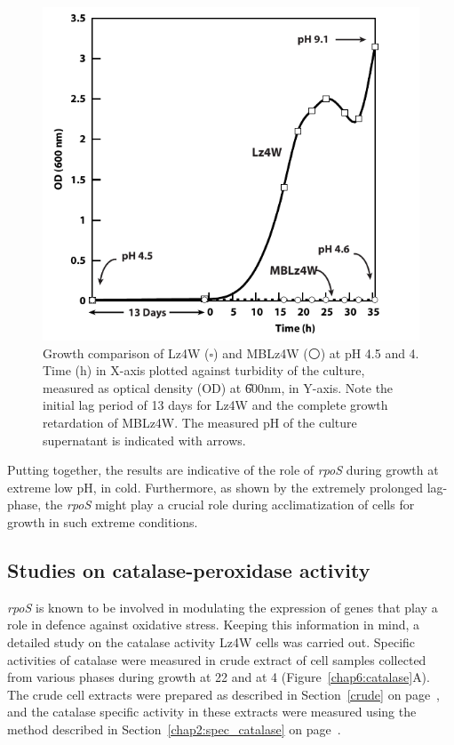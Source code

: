 \begin{figure}[tbp]
\centering
\includegraphics{figures/chap6_ph4_5}
\caption[Growth comparison at pH 4.5]{Growth comparison of Lz4W
($\square$) and MBLz4W ($\medcirc$) at pH 4.5 and 4\dg{}\@. Time
(h) in X-axis plotted against turbidity of the culture, measured
as optical density (OD) at \U{600}{nm}, in Y-axis. Note the
initial lag period of 13 days for Lz4W and the complete growth
retardation of MBLz4W. The measured pH of the culture supernatant
is indicated with arrows.} \label{chap6:ph_4_5}
\end{figure}

Putting together, the results are indicative of the role of
\emph{rpoS} during growth at extreme low pH, in cold. Furthermore,
as shown by the extremely prolonged lag-phase, the \emph{rpoS}
might play a crucial role during acclimatization of cells for
growth in such extreme conditions.

\subsection{Studies on catalase-peroxidase activity}

\emph{rpoS} is known to be involved in modulating the expression
of genes that play a role in defence against oxidative stress.
Keeping this information in mind, a detailed study on the catalase
activity Lz4W cells was carried out. Specific activities of
catalase were measured in crude extract of cell samples collected
from various phases during growth at 22\dg{} and at 4\dg{}
(Figure~\ref{chap6:catalase}A)\@. The crude cell extracts were
prepared as described in Section~\ref{crude} on
page~\pageref{crude}, and the catalase specific activity in these
extracts were measured using the method described in
Section~\ref{chap2:spec_catalase} on
page~\pageref{chap2:spec_catalase}.


